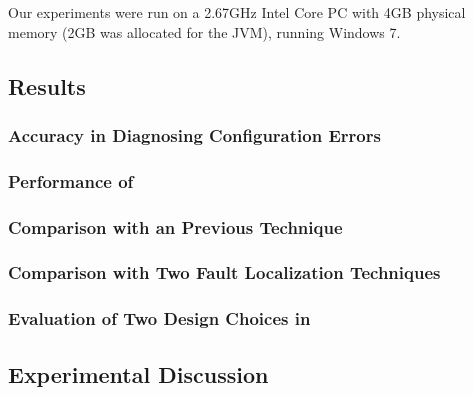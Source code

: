 
Our experiments were run on a
2.67GHz Intel Core PC with 4GB physical memory (2GB was allocated
for the JVM), running Windows 7.


\vspace{-1mm}
\subsection{Results}
\label{sec:results}


\subsubsection{Accuracy in Diagnosing Configuration Errors}
\label{sec:accuracy}


\enlargethispage{5pt}

\subsubsection{Performance of \ourtool}
\label{sec:performance}


\subsubsection{Comparison with an Previous Technique}
\label{sec:confanalyzer}



\subsubsection{Comparison with Two Fault Localization Techniques}
\label{sec:comparison}




\subsubsection{Evaluation of Two Design Choices in \ourtool}
\label{sec:choices}



\vspace{-1mm}
\subsection{Experimental Discussion}
\vspace{-1mm}


